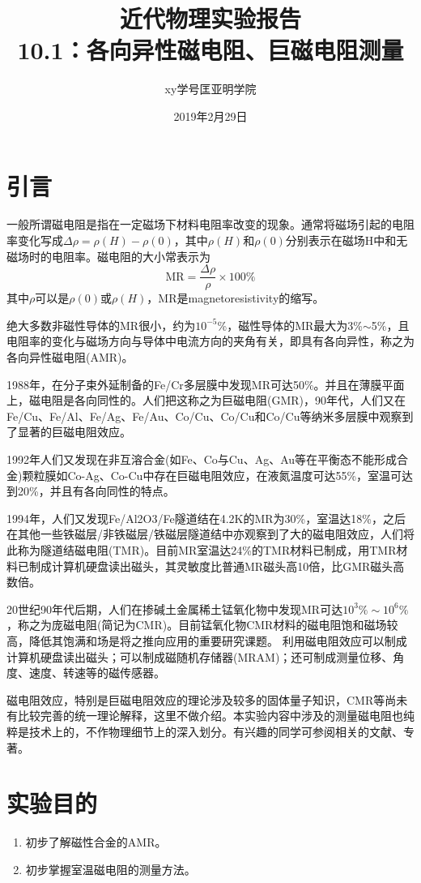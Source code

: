 \documentclass[a4paper]{article}
\title{\Huge 近代物理实验报告\\\huge 10.1：各向异性磁电阻、巨磁电阻测量}
\author{xy\quad 学号\quad 匡亚明学院}
\date{2019年2月29日}
\begin{document}
\maketitle


\section{引言}
一般所谓磁电阻是指在一定磁场下材料电阻率改变的现象。通常将磁场引起的电阻率变化写成$\Delta\rho = \rho(H) - \rho(0)$，其中$\rho(H)$和$\rho(0)$分别表示在磁场H中和无磁场时的电阻率。磁电阻的大小常表示为
\begin{equation*}
	\text{MR} = \frac{\Delta\rho}{\rho}\times 100\%
\end{equation*}
其中$\rho$可以是$\rho(0)$或$\rho(H)$，MR是magnetoresistivity的缩写。

绝大多数非磁性导体的MR很小，约为$10^{-5}$\%，磁性导体的MR最大为3\%$\sim$5\%，且电阻率的变化与磁场方向与导体中电流方向的夹角有关，即具有各向异性，称之为各向异性磁电阻(AMR)。

1988年，在分子束外延制备的Fe/Cr多层膜中发现MR可达50\%。并且在薄膜平面上，磁电阻是各向同性的。人们把这称之为巨磁电阻(GMR)，90年代，人们又在Fe/Cu、Fe/Al、Fe/Ag、Fe/Au、Co/Cu、Co/Cu和Co/Cu等纳米多层膜中观察到了显著的巨磁电阻效应。

1992年人们又发现在非互溶合金(如Fe、Co与Cu、Ag、Au等在平衡态不能形成合金)颗粒膜如Co-Ag、Co-Cu中存在巨磁电阻效应，在液氮温度可达55\%，室温可达到20\%，并且有各向同性的特点。

1994年，人们又发现Fe/Al2O3/Fe隧道结在4.2K的MR为30\%，室温达18\%，之后在其他一些铁磁层/非铁磁层/铁磁层隧道结中亦观察到了大的磁电阻效应，人们将此称为隧道结磁电阻(TMR)。目前MR室温达24\%的TMR材料已制成，用TMR材料已制成计算机硬盘读出磁头，其灵敏度比普通MR磁头高10倍，比GMR磁头高数倍。

20世纪90年代后期，人们在掺碱土金属稀土锰氧化物中发现MR可达$10^3\%\sim 10^6\%$，称之为庞磁电阻(简记为CMR)。目前锰氧化物CMR材料的磁电阻饱和磁场较高，降低其饱满和场是将之推向应用的重要研究课题。
利用磁电阻效应可以制成计算机硬盘读出磁头；可以制成磁随机存储器(MRAM)；还可制成测量位移、角度、速度、转速等的磁传感器。

磁电阻效应，特别是巨磁电阻效应的理论涉及较多的固体量子知识，CMR等尚未有比较完善的统一理论解释，这里不做介绍。本实验内容中涉及的测量磁电阻也纯粹是技术上的，不作物理细节上的深入划分。有兴趣的同学可参阅相关的文献、专著。

\section{实验目的}
\begin{enumerate}
	\item 初步了解磁性合金的AMR。
	\item 初步掌握室温磁电阻的测量方法。
\end{enumerate}
\end{document}
